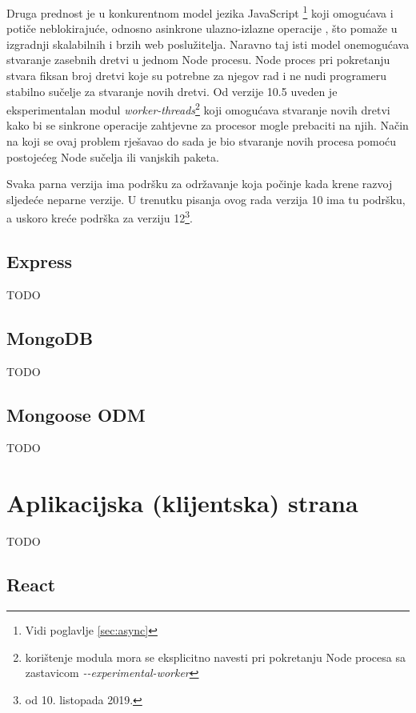 \documentclass[times, utf8, diplomski, numeric]{fer}
\begin{document}
Druga prednost je u konkurentnom model jezika JavaScript \footnote{Vidi poglavlje \ref{sec:async}} koji omogućava i potiče neblokirajuće, odnosno asinkrone ulazno-izlazne operacije , što pomaže u izgradnji skalabilnih i brzih web poslužitelja.
Naravno taj isti model onemogućava stvaranje zasebnih dretvi u jednom Node procesu. Node proces pri pokretanju stvara fiksan broj dretvi koje su potrebne za njegov rad i ne nudi programeru stabilno sučelje za stvaranje novih dretvi.
Od verzije 10.5 uveden je eksperimentalan modul \emph{worker-threads}\footnote{
    korištenje modula mora se eksplicitno navesti pri pokretanju Node procesa sa zastavicom \emph{-{}-experimental-worker}
} koji omogućava stvaranje novih dretvi kako bi se sinkrone operacije zahtjevne za procesor  mogle prebaciti na njih.
Način na koji se ovaj problem rješavao do sada je bio stvaranje novih procesa pomoću postojećeg Node sučelja ili vanjskih paketa\citep{art_node}.

Svaka parna verzija ima podršku za održavanje  koja počinje kada krene razvoj sljedeće neparne verzije.
U trenutku pisanja ovog rada verzija 10 ima tu podršku, a uskoro kreće podrška za verziju 12\footnote{od 10. listopada 2019.}\citep{wiki_node}.


\subsection{Express}

TODO


\subsection{MongoDB}

TODO


\subsection{Mongoose ODM}

TODO


\newpage
\section{Aplikacijska (klijentska) strana}

TODO


\subsection{React}
\end{document}
